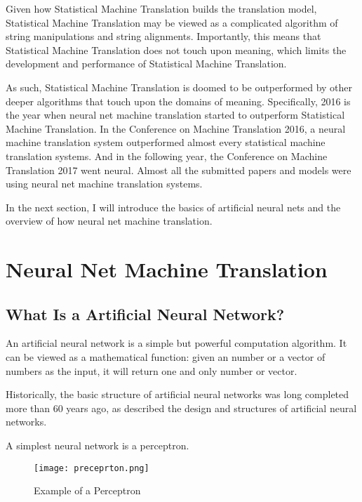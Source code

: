 Given how Statistical Machine Translation builds the translation model, Statistical Machine Translation may be viewed as a complicated algorithm of string manipulations and string alignments. 
Importantly, this means that Statistical Machine Translation does not touch upon meaning, which limits the development and performance of Statistical Machine Translation. 

As such, Statistical Machine Translation is doomed to be outperformed by other deeper algorithms that touch upon the domains of meaning. Specifically, 2016 is the year when neural net machine translation started to outperform Statistical Machine Translation. In the Conference on Machine Translation 2016, a neural machine translation system outperformed almost every statistical machine translation systems. And in the following year, the Conference on Machine Translation 2017 went neural. Almost all the submitted papers and models were using neural net machine translation systems. 

In the next section, I will introduce the basics of artificial neural nets and the overview of how neural net machine translation.  

\section{Neural Net Machine Translation}\label{neural_MT}

\subsection{What Is a Artificial Neural Network?}

An artificial neural network is a simple but powerful computation algorithm. It can be viewed as a mathematical function: given an number or a vector of numbers as the input, it will return one and only number or vector. 

Historically, the basic structure of artificial neural networks was long completed more than 60 years ago, as \citet{rosenblatt} described the design and structures of artificial neural networks. 

A simplest neural network is a perceptron. 

\begin{figure}[h]
\caption{Example of a Perceptron \citep{lippmann1987introduction}}
\centering
\texttt{[image: preceprton.png]}
\end{figure}    

